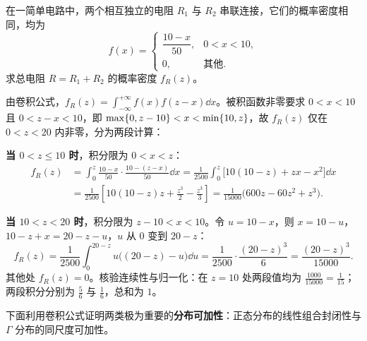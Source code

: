 \begin{example}[title={串联两电阻的总电阻分布}]
\label{eg:resistor-convolution}
在一简单电路中，两个相互独立的电阻 $R_1$ 与 $R_2$ 串联连接，它们的概率密度相同，均为
\[
  f(x)=
  \begin{cases}
    \dfrac{10-x}{50},& 0<x<10,\\
    0,& \text{其他}.
  \end{cases}
\]
求总电阻 $R=R_1+R_2$ 的概率密度 $f_R(z)$。
\begin{solution}
由卷积公式，$f_R(z)=\int_{-\infty}^{+\infty}f(x)f(z-x)\dd x$。被积函数非零要求 $0<x<10$ 且 $0<z-x<10$，即 $\max\{0,z-10\}<x<\min\{10,z\}$，故 $f_R(z)$ 仅在 $0<z<20$ 内非零，分为两段计算：

\textbf{当 $0<z\le 10$ 时}，积分限为 $0<x<z$：
\[
\begin{aligned}
  f_R(z)&=\int_{0}^{z}\frac{10-x}{50}\cdot\frac{10-(z-x)}{50}\dd x
  =\frac{1}{2500}\int_{0}^{z}\bigl[10(10-z)+zx-x^2\bigr]\dd x\\
  &=\frac{1}{2500}\left[10(10-z)z+\frac{z^3}{2}-\frac{z^3}{3}\right]
  =\frac{1}{15000}\bigl(600z-60z^2+z^3\bigr).
\end{aligned}
\]

\textbf{当 $10<z<20$ 时}，积分限为 $z-10<x<10$。令 $u=10-x$，则 $x=10-u$，$10-z+x=20-z-u$，$u$ 从 $0$ 变到 $20-z$：
\[
  f_R(z)=\frac{1}{2500}\int_{0}^{20-z}u\bigl((20-z)-u\bigr)\dd u
  =\frac{1}{2500}\cdot\frac{(20-z)^3}{6}
  =\frac{(20-z)^3}{15000}.
\]
其他处 $f_R(z)=0$。核验连续性与归一化：在 $z=10$ 处两段值均为 $\frac{1000}{15000}=\frac{1}{15}$；两段积分分别为 $\frac{5}{6}$ 与 $\frac{1}{6}$，总和为 $1$。
\end{solution}
\end{example}

下面利用卷积公式证明两类极为重要的\textbf{分布可加性}：正态分布的线性组合封闭性与 $\Gamma$ 分布的同尺度可加性。

